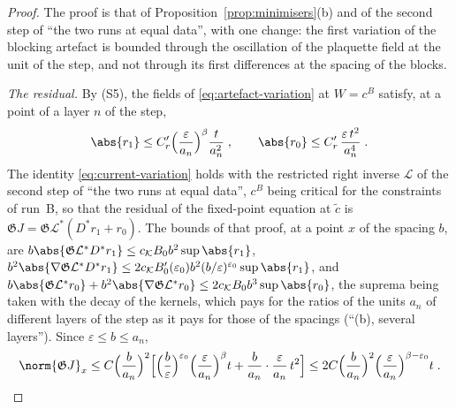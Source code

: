 \begin{proof}
The proof is that of Proposition~\ref{prop:minimisers}(b) and of the second step of ``the two runs at equal data'', with one change: the first variation of the blocking artefact is bounded through the oscillation of the plaquette field at the unit of the step, and not through its first differences at the spacing of the blocks.

\emph{The residual.} By (S5), the fields of \eqref{eq:artefact-variation} at $W = c^B$ satisfy, at a point of a layer $n$ of the step,
\[
    \abs{r_1} \leq C_r'\Bigl(\frac{\varepsilon}{a_n}\Bigr)^\beta\frac{t}{a_n^2}\;,
    \qquad
    \abs{r_0} \leq C_r'\,\frac{\varepsilon\,t^2}{a_n^4}\;.
\]
The identity \eqref{eq:current-variation} holds with the restricted right inverse $\mathcal L$ of the second step of ``the two runs at equal data'', $c^B$ being critical for the constraints of run~B, so that the residual of the fixed-point equation at $\tilde c$ is $\mathfrak GJ = \mathfrak G\mathcal L^*(D^*r_1 + r_0)$. The bounds of that proof, at a point $x$ of the spacing $b$, are $b\abs{\mathfrak G\mathcal L^*D^*r_1} \leq c_{\mathcal K}B_0b^2\sup\abs{r_1}$, $b^2\abs{\nabla\mathfrak G\mathcal L^*D^*r_1} \leq 2c_{\mathcal K}B'_0(\varepsilon_0)b^2(b/\varepsilon)^{\varepsilon_0}\sup\abs{r_1}$, and $b\abs{\mathfrak G\mathcal L^*r_0} + b^2\abs{\nabla\mathfrak G\mathcal L^*r_0} \leq 2c_{\mathcal K}B_0b^3\sup\abs{r_0}$, the suprema being taken with the decay of the kernels, which pays for the ratios of the units $a_n$ of different layers of the step as it pays for those of the spacings (``(b), several layers''). Since $\varepsilon \leq b \leq a_n$,
\[
    \norm{\mathfrak GJ}_x \leq C\Bigl(\frac{b}{a_n}\Bigr)^2\Bigl[\Bigl(\frac{b}{\varepsilon}\Bigr)^{\varepsilon_0}\Bigl(\frac{\varepsilon}{a_n}\Bigr)^\beta t + \frac{b}{a_n}\cdot\frac{\varepsilon}{a_n}\,t^2\Bigr] \leq 2C\Bigl(\frac{b}{a_n}\Bigr)^2\Bigl(\frac{\varepsilon}{a_n}\Bigr)^{\beta-\varepsilon_0}t\;.
\]


\end{proof}
